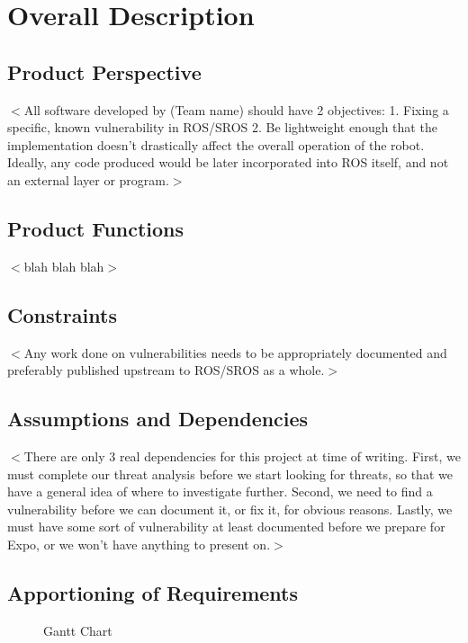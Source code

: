 \documentclass{scrreprt}
\begin{document}
\chapter{Overall Description}

\section{Product Perspective}
$<$All software developed by (Team name) should have 2 objectives:
1. Fixing a specific, known vulnerability in ROS/SROS
2. Be lightweight enough that the implementation doesn't drastically affect the overall operation of the robot. Ideally, any code produced would be later incorporated into ROS itself, and not an external layer or program.$>$

\section{Product Functions}
$<$blah blah blah$>$

\section{Constraints}
$<$Any work done on vulnerabilities needs to be appropriately documented and preferably published upstream to ROS/SROS as a whole.$>$

\section{Assumptions and Dependencies}
$<$There are only 3 real dependencies for this project at time of writing. First, we must complete our threat analysis before we start looking for threats,
so that we have a general idea of where to investigate further. Second, we need to find a vulnerability before we can document it, or fix it, for obvious reasons.
Lastly, we must have some sort of vulnerability at least documented before we prepare for Expo, or we won't have anything to present on.$>$

\section{Apportioning of Requirements}
  \begin{center}
    \begin{figure}
      \caption{Gantt Chart}
      \label{fig:gantt}
    \end{figure}
  \end{center}
\end{document}

